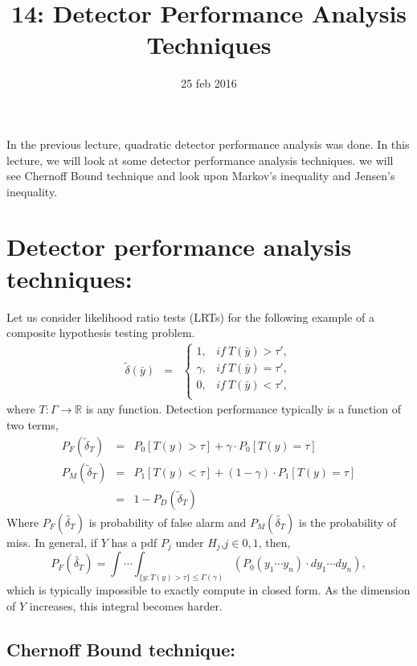 \documentclass[a4paper,english,12pt]{article}
\title{14: Detector Performance Analysis Techniques}
\date{25 feb 2016}
\author{}
\begin{document}
\maketitle
In the previous lecture, quadratic detector performance analysis was done. In this lecture, we will look at some detector performance analysis techniques. we will see Chernoff Bound technique and look upon Markov's inequality and Jensen's inequality.
\section{Detector performance analysis techniques:}
Let us consider likelihood ratio tests (LRTs) for the following example of a composite hypothesis testing problem.
\begin{eqnarray}
\tilde{\delta}(\bar{y}) &=&
\begin{cases}
1, &if~ T(\bar{y}) > \tau',\\
\gamma, &if~  T(\bar{y}) = \tau',\\
0, &if~ T(\bar{y}) < \tau',\\
\end{cases}
\end{eqnarray}
where $T: \Gamma\rightarrow\mathbb{R}$ is any function.
Detection performance typically is a function of two terms,
\begin{eqnarray}
P_F(\tilde\delta_T) &=& P_0[T(y)>\tau]+\gamma\cdot P_0[T(y)=\tau]\\
P_M(\tilde\delta_T) &=& P_1[T(y)<\tau]+(1-\gamma)\cdot P_1[T(y)=\tau]\\\nonumber
&=& 1-P_D(\tilde\delta_T)
\end{eqnarray}
Where $P_F(\tilde{\delta_T})$ is probability of false alarm and $P_M(\tilde{\delta_T})$ is the probability of miss.
In general, if $Y$ has a pdf $P_j$ under $H_j$,$j\in {0,1}$, then,
\begin{equation}
P_F(\tilde{\delta_T})=\int\cdots\int_{\{y:T(y)>\tau\} \leq\Gamma(\gamma)} (P_0(y_1\cdots y_n)\cdot dy_1\cdots dy_n),
\end{equation}
which is typically impossible to exactly compute in closed form. As the dimension of $Y$ increases, this integral becomes harder. 
\subsection{Chernoff Bound technique:}
\end{document}

